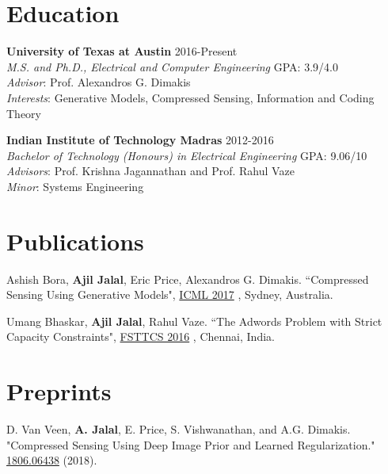 \documentclass[margin, 11pt]{res} %
\begin{document}
\vspace*{-13pt}
\begin{resume}

 
\section{\large Education}
{\bf University of Texas at Austin} \hfill 2016-Present\\
{\sl M.S. and Ph.D., Electrical and Computer Engineering} \hfill GPA: 3.9/4.0 \\
{\sl Advisor}: Prof. Alexandros G. Dimakis \\
{\sl Interests}: Generative Models, Compressed Sensing, Information and Coding Theory

{\bf Indian Institute of Technology Madras} \hfill 2012-2016\\
{\sl Bachelor of Technology (Honours) in Electrical Engineering} \hfill GPA: 9.06/10 \\
{\sl Advisors}: Prof. Krishna Jagannathan and Prof. Rahul Vaze \\
{\sl Minor}: Systems Engineering 

\section{\large Publications} 
Ashish Bora, {\bf Ajil Jalal}, Eric Price, Alexandros G. Dimakis. ``Compressed Sensing Using Generative Models", \href{http://proceedings.mlr.press/v70/bora17a/bora17a.pdf}{ICML 2017} , Sydney, Australia.

Umang Bhaskar, {\bf Ajil Jalal}, Rahul Vaze. ``The Adwords Problem with Strict Capacity Constraints", \href{http://drops.dagstuhl.de/opus/volltexte/2016/6907/pdf/lipics-vol65-fsttcs2016-complete.pdf#page=365}{FSTTCS 2016} , Chennai, India.

\section{\large Preprints}
D. Van Veen, {\bf A. Jalal}, E. Price, S. Vishwanathan, and A.G. Dimakis. "Compressed Sensing Using Deep Image Prior and Learned Regularization." \href{https://arxiv.org/abs/1806.06438}{1806.06438} (2018).


\end{resume}
\end{document}
